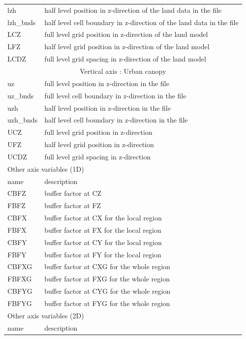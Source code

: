 \begin{longtable}{l|l}
lzh       & half level position in z-direction of the land data in the file \\
lzh\_bnds & half level cell boundary in z-direction of the land data in the file \\
LCZ  & full level grid position in z-direction of the land model \\
LFZ  & half level grid position in z-direction of the land model \\
LCDZ & full level grid spacing in z-direction of the land model \\  \hline
\multicolumn{2}{c}{Vertical axis : Urban canopy}\\ \hline
uz        & full level position in z-direction in the file \\
uz\_bnds  & full level cell boundary in z-direction in the file \\
uzh       & half level position in z-direction in the file \\
uzh\_bnds & half level cell boundary in z-direction in the file \\
UCZ  & full level grid position in z-direction \\
UFZ  & half level grid position in z-direction \\
UCDZ & full level grid spacing in z-direction \\ \hline
 \hline
  \multicolumn{2}{l}{Other axis variables (1D)}\\ \hline
name  & description \\ \hline \hline
CBFZ  & buffer factor at CZ \\
FBFZ  & buffer factor at FZ \\
CBFX  & buffer factor at CX for the local region \\
FBFX  & buffer factor at FX for the local region \\
CBFY  & buffer factor at CY for the local region \\
FBFY  & buffer factor at FY for the local region \\
CBFXG & buffer factor at CXG for the whole region \\
FBFXG & buffer factor at FXG for the whole region \\
CBFYG & buffer factor at CYG for the whole region \\
FBFYG & buffer factor at FYG for the whole region \\
\hline
\multicolumn{2}{l}{Other axis variables (2D)}\\ \hline
name & description \\ \hline \hline

\end{longtable}
